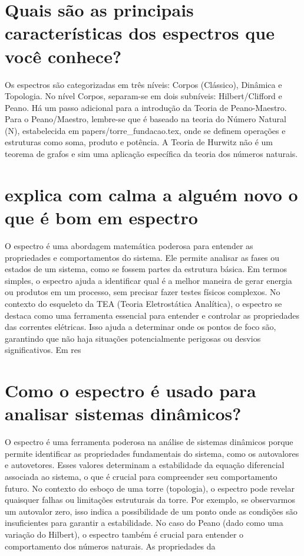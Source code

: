 \documentclass[11pt,a4paper]{article}
\begin{document}
\section{Quais são as principais características dos espectros que você conhece?}
Os espectros são categorizadas em três níveis: Corpos (Clássico), Dinâmica e Topologia. No nível Corpos, separam-se em dois subníveis: Hilbert/Clifford e Peano. Há um passo adicional para a introdução da Teoria de Peano-Maestro. Para o Peano/Maestro, lembre-se que é baseado na teoria do Número Natural (N), estabelecida em papers/torre\_fundacao.tex, onde se definem operações e estruturas como soma, produto e potência. A Teoria de Hurwitz não é um teorema de grafos e sim uma aplicação específica da teoria dos números naturais.

\section{explica com calma a alguém novo o que é bom em espectro}
O espectro é uma abordagem matemática poderosa para entender as propriedades e comportamentos do sistema. Ele permite analisar as fases ou estados de um sistema, como se fossem partes da estrutura básica. Em termos simples, o espectro ajuda a identificar qual é a melhor maneira de gerar energia ou produtos em um processo, sem precisar fazer testes físicos complexos. No contexto do esqueleto da TEA (Teoria Eletrostática Analítica), o espectro se destaca como uma ferramenta essencial para entender e controlar as propriedades das correntes elétricas. Isso ajuda a determinar onde os pontos de foco são, garantindo que não haja situações potencialmente perigosas ou desvios significativos. Em res

\section{Como o espectro é usado para analisar sistemas dinâmicos?}
O espectro é uma ferramenta poderosa na análise de sistemas dinâmicos porque permite identificar as propriedades fundamentais do sistema, como os autovalores e autovetores. Esses valores determinam a estabilidade da equação diferencial associada ao sistema, o que é crucial para compreender seu comportamento futuro. No contexto do esboço de uma torre (topologia), o espectro pode revelar quaisquer falhas ou limitações estruturais da torre. Por exemplo, se observarmos um autovalor zero, isso indica a possibilidade de um ponto onde as condições são insuficientes para garantir a estabilidade. No caso do Peano (dado como uma variação do Hilbert), o espectro também é crucial para entender o comportamento dos números naturais. As propriedades da
\end{document}

